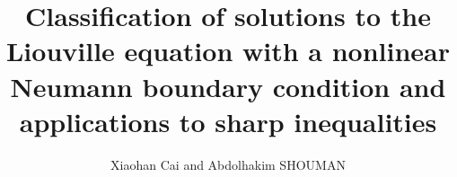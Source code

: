\documentclass[11pt,a4paper,twoside]{amsart}
\newtheorem{sketch proof}{Sketch of the proof}[section]
\begin{document}
	
	\title [Classification of solutions to Liouville equations and applications]{Classification of solutions to the Liouville equation with a nonlinear Neumann boundary condition and applications to sharp inequalities}


	\author{Xiaohan Cai and Abdolhakim SHOUMAN\\}
	\date{}
		\date{}

        \address{\noindent Xiaohan Cai\newline Shanghai Jiao Tong University, Shanghai,  200240, P. R. China. %
	}  
    
	\address{\noindent Abdolhakim Shouman\newline Université de Tours, Université d’Orléans, CNRS, IDP, UMR 7013, Tours, France
    }  
    
    
	

    	
   
\end{document}
